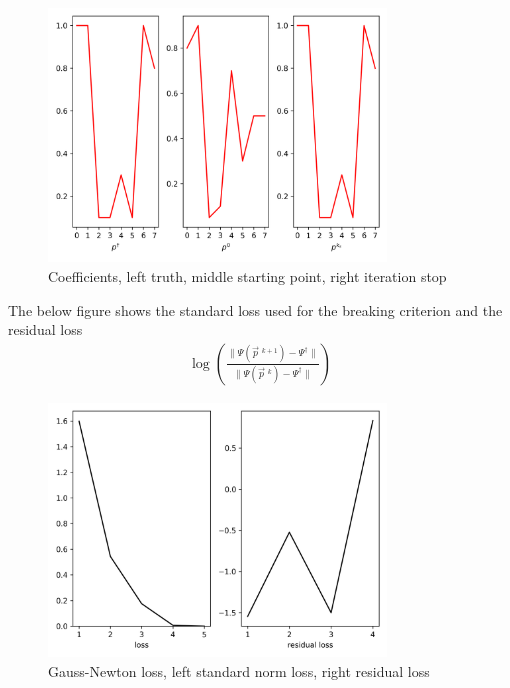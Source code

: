 \begin{figure}[H]
    \centering
    \includegraphics[width=0.8\textwidth]{./pics/gn_coeff.png}
    \caption{Coefficients, left truth, middle starting point, right
    iteration stop}
    \label{fig: gn_coeff}
\end{figure}
The below figure shows the standard loss used for the breaking criterion and
the residual loss
\begin{align}
    \log \left( \frac{\|\Psi(\vec{p}\;^{k+1}) -
    \Psi^{\dagger}\|}{\|\Psi(\vec{p}\;^{k}) - \Psi^{\dagger}\|} \right)
\end{align}
\begin{figure}[H]
    \centering
    \includegraphics[width=0.8\textwidth]{./pics/gn_loss.png}
    \caption{Gauss-Newton loss, left standard norm loss, right residual loss}
    \label{fig: gn_loss}
\end{figure}


